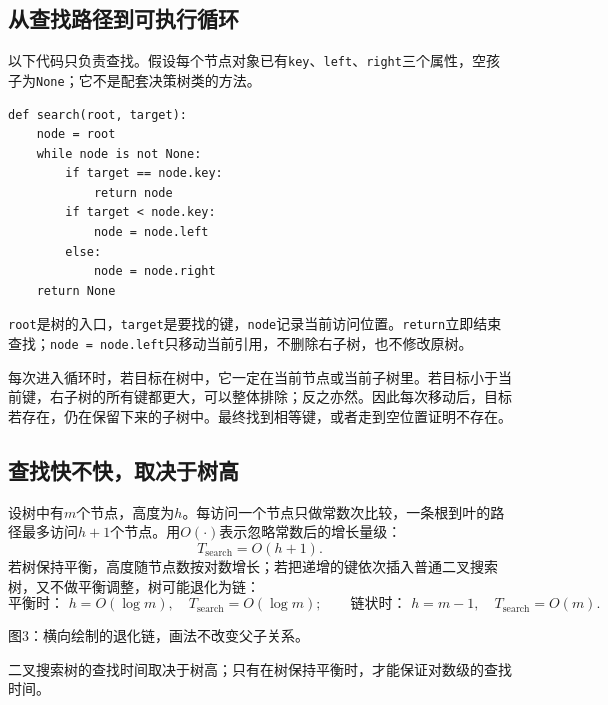 \documentclass[UTF8,a4paper,11pt,fontset=fandol]{ctexart}
\numberwithin{equation}{subsection}
\begin{document}
\subsection{从查找路径到可执行循环}
以下代码只负责查找。假设每个节点对象已有\texttt{key}、\texttt{left}、\texttt{right}三个属性，空孩子为\texttt{None}；它不是配套决策树类的方法。
\begin{Verbatim}[frame=single,framesep=2mm,fontsize=\small,baselinestretch=1]
def search(root, target):
    node = root
    while node is not None:
        if target == node.key:
            return node
        if target < node.key:
            node = node.left
        else:
            node = node.right
    return None
\end{Verbatim}
\texttt{root}是树的入口，\texttt{target}是要找的键，\texttt{node}记录当前访问位置。\texttt{return}立即结束查找；\texttt{node = node.left}只移动当前引用，不删除右子树，也不修改原树。

\begin{proofbox}[为什么不会漏掉已存在的键]
每次进入循环时，若目标在树中，它一定在当前节点或当前子树里。若目标小于当前键，右子树的所有键都更大，可以整体排除；反之亦然。因此每次移动后，目标若存在，仍在保留下来的子树中。最终找到相等键，或者走到空位置证明不存在。
\end{proofbox}

\subsection{查找快不快，取决于树高}
设树中有$m$个节点，高度为$h$。每访问一个节点只做常数次比较，一条根到叶的路径最多访问$h+1$个节点。用$O(\cdot)$表示忽略常数后的增长量级：
\begin{equation}
T_{\mathrm{search}}=O(h+1).
\end{equation}
若树保持平衡，高度随节点数按对数增长；若把递增的键依次插入普通二叉搜索树，又不做平衡调整，树可能退化为链：
\begin{equation}
\text{平衡时： }h=O(\log m),\quad T_{\mathrm{search}}=O(\log m);
\qquad
\text{链状时： }h=m-1,\quad T_{\mathrm{search}}=O(m).
\end{equation}
\begin{center}

{\small 图3：横向绘制的退化链，画法不改变父子关系。}
\end{center}
\begin{pitfallbox}
二叉搜索树的查找时间取决于树高；只有在树保持平衡时，才能保证对数级的查找时间。
\end{pitfallbox}
\end{document}
